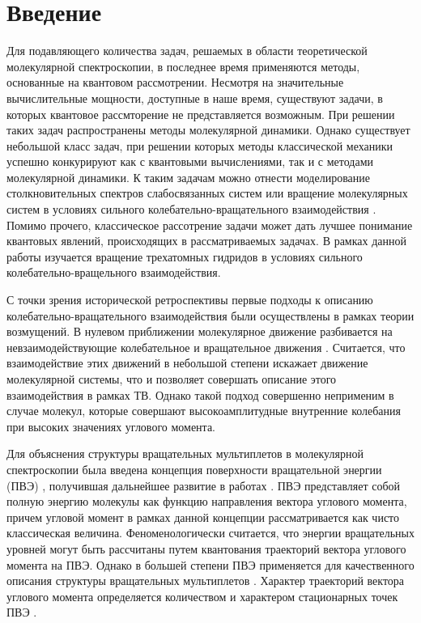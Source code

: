 \section{Введение}

\vpravo Для подавляющего количества задач, решаемых в области теоретической молекулярной спектроскопии, в последнее время применяются методы, основанные на квантовом рассмотрении. Несмотря на значительные вычислительные мощности, доступные в наше время, существуют задачи, в которых квантовое рассмторение не представляется возможным. При решении таких задач распространены методы молекулярной динамики. Однако существует небольшой класс задач, при решении которых методы классической механики успешно конкурируют как с квантовыми вычислениями, так и с методами молекулярной динамики. К таким задачам можно отнести моделирование столкновительных спектров слабосвязанных систем \cite{lok2004} или вращение молекулярных систем в условиях сильного колебательно-вращательного взаимодействия \cite{petrov2015}. Помимо прочего, классическое рассотрение задачи может дать лучшее понимание квантовых явлений, происходящих в рассматриваемых задачах. В рамках данной работы изучается вращение трехатомных гидридов в условиях сильного колебательно-вращельного взаимодействия. \par
С точки зрения исторической ретроспективы первые подходы к описанию колебательно-вращательного взаимодействия были осуществлены в рамках теории возмущений. В нулевом приближении молекулярное движение разбивается на невзаимодействующие колебательное и вращательное движения \cite{wilson}. Считается, что взаимодействие этих движений в небольшой степени искажает движение молекулярной системы, что и позволяет совершать описание этого взаимодействия в рамках ТВ. Однако такой подход совершенно неприменим в случае молекул, которые совершают высокоамплитудные внутренние колебания при высоких значениях углового момента. \par
Для объяснения структуры вращательных мультиплетов в молекулярной спектроскопии была введена концепция поверхности вращательной энергии (ПВЭ) \cite{king1947}, получившая дальнейшее развитие в работах \cite{har1984, makar1998}. ПВЭ представляет собой полную энергию молекулы как функцию направления вектора углового момента, причем угловой момент в рамках данной концепции рассматривается как чисто классическая величина. Феноменологически считается, что энергии вращательных уровней могут быть рассчитаны путем квантования траекторий вектора углового момента на ПВЭ. Однако в большей степени ПВЭ применяется для качественного описания структуры вращательных мультиплетов \cite{makar1998}. Характер траекторий вектора углового момента определяется количеством и характером стационарных точек ПВЭ \cite{pav1985, pav1987}. \par
